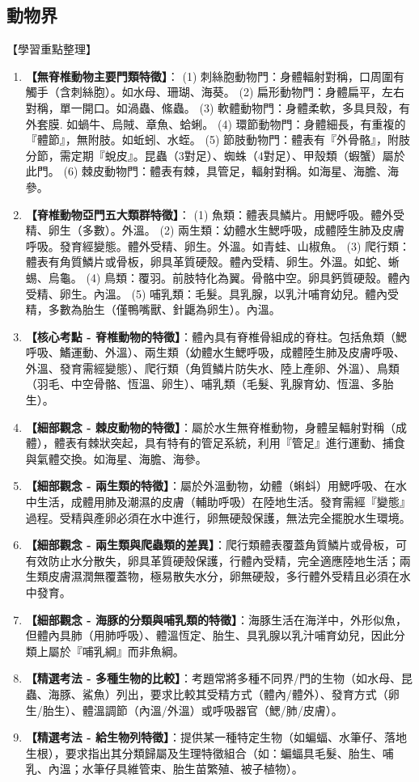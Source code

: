 \documentclass[11pt,a4paper]{article}
\begin{document}
\subsection{動物界}
\begin{learningpoints}{【學習重點整理】}
\begin{enumerate}[label=\arabic*.]
  \item \textbf{【無脊椎動物主要門類特徵】}：
  (1) 刺絲胞動物門：身體輻射對稱，口周圍有觸手（含刺絲胞）。如水母、珊瑚、海葵。
  (2) 扁形動物門：身體扁平，左右對稱，單一開口。如渦蟲、絛蟲。
  (3) 軟體動物門：身體柔軟，多具貝殼，有外套膜. 如蝸牛、烏賊、章魚、蛤蜊。
  (4) 環節動物門：身體細長，有重複的『體節』，無附肢。如蚯蚓、水蛭。
  (5) 節肢動物門：體表有『外骨骼』，附肢分節，需定期『蛻皮』。昆蟲（3對足）、蜘蛛（4對足）、甲殼類（蝦蟹）屬於此門。
  (6) 棘皮動物門：體表有棘，具管足，輻射對稱。如海星、海膽、海參。
  \item \textbf{【脊椎動物亞門五大類群特徵】}：
  (1) 魚類：體表具鱗片。用鰓呼吸。體外受精、卵生（多數）。外溫。
  (2) 兩生類：幼體水生鰓呼吸，成體陸生肺及皮膚呼吸。發育經變態。體外受精、卵生。外溫。如青蛙、山椒魚。
  (3) 爬行類：體表有角質鱗片或骨板，卵具革質硬殼。體內受精、卵生。外溫。如蛇、蜥蜴、烏龜。
  (4) 鳥類：覆羽。前肢特化為翼。骨骼中空。卵具鈣質硬殼。體內受精、卵生。內溫。
  (5) 哺乳類：毛髮。具乳腺，以乳汁哺育幼兒。體內受精，多數為胎生（僅鴨嘴獸、針鼴為卵生）。內溫。
  \item \textbf{【核心考點 - 脊椎動物的特徵】}：體內具有脊椎骨組成的脊柱。包括魚類（鰓呼吸、鰭運動、外溫）、兩生類（幼體水生鰓呼吸，成體陸生肺及皮膚呼吸、外溫、發育需經變態）、爬行類（角質鱗片防失水、陸上產卵、外溫）、鳥類（羽毛、中空骨骼、恆溫、卵生）、哺乳類（毛髮、乳腺育幼、恆溫、多胎生）。
  \item \textbf{【細部觀念 - 棘皮動物的特徵】}：屬於水生無脊椎動物，身體呈輻射對稱（成體），體表有棘狀突起，具有特有的管足系統，利用『管足』進行運動、捕食與氣體交換。如海星、海膽、海參。
  \item \textbf{【細部觀念 - 兩生類的特徵】}：屬於外溫動物，幼體（蝌蚪）用鰓呼吸、在水中生活，成體用肺及潮濕的皮膚（輔助呼吸）在陸地生活。發育需經『變態』過程。受精與產卵必須在水中進行，卵無硬殼保護，無法完全擺脫水生環境。
  \item \textbf{【細部觀念 - 兩生類與爬蟲類的差異】}：爬行類體表覆蓋角質鱗片或骨板，可有效防止水分散失，卵具革質硬殼保護，行體內受精，完全適應陸地生活；兩生類皮膚濕潤無覆蓋物，極易散失水分，卵無硬殼，多行體外受精且必須在水中發育。
  \item \textbf{【細部觀念 - 海豚的分類與哺乳類的特徵】}：海豚生活在海洋中，外形似魚，但體內具肺（用肺呼吸）、體溫恆定、胎生、具乳腺以乳汁哺育幼兒，因此分類上屬於『哺乳綱』而非魚綱。
  \item \textbf{【精選考法 - 多種生物的比較】}：考題常將多種不同界/門的生物（如水母、昆蟲、海豚、鯊魚）列出，要求比較其受精方式（體內/體外）、發育方式（卵生/胎生）、體溫調節（內溫/外溫）或呼吸器官（鰓/肺/皮膚）。
  \item \textbf{【精選考法 - 給生物列特徵】}：提供某一種特定生物（如蝙蝠、水筆仔、落地生根），要求指出其分類歸屬及生理特徵組合（如：蝙蝠具毛髮、胎生、哺乳、內溫；水筆仔具維管束、胎生苗繁殖、被子植物）。
\end{enumerate}
\end{learningpoints}
\end{document}
